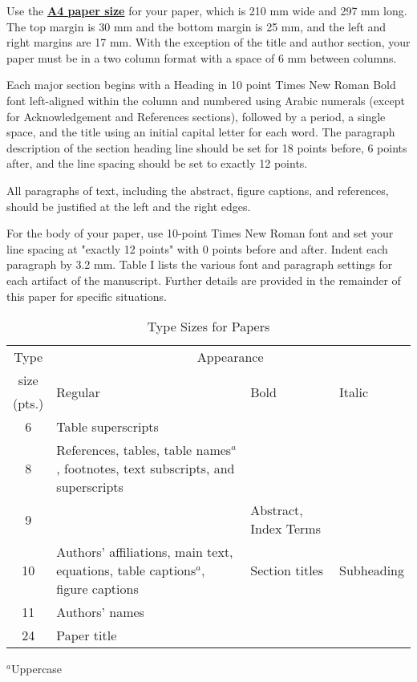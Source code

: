 \documentclass[conference,a4paper]{isap2025}
\begin{document}
Use the \underline{\bf A4 paper size} for your paper, which is 210 mm wide and 297 mm long. The top margin is 30 mm and the bottom margin is 25 mm, and the left and right margins are 17 mm. With the exception of the title and author section, your paper must be in a two column format with a space of 6 mm between columns. 

Each major section begins with a Heading in 10 point Times New Roman Bold font left-aligned within the column and numbered using Arabic numerals (except for Acknowledgement and References sections), followed by a period, a single space, and the title using an initial capital letter for each word. The paragraph description of the section heading line should be set for 18 points before, 6 points after, and the line spacing should be set to exactly 12 points.

All paragraphs of text, including the abstract, figure captions, and references, should be justified at the left and the right edges.

For the body of your paper, use 10-point Times New Roman font and set your line spacing at "exactly 12 points" with 0 points before and after. Indent each paragraph by 3.2 mm. Table I lists the various font and paragraph settings for each artifact of the manuscript. Further details are provided in the remainder of this paper for specific situations.

\begin{table}[htb]
\caption{Type Sizes for Papers}
\begin{center}
\begin{tabular}{|c|p{30mm}|p{15mm}|p{15mm}|}
\hline
Type & \multicolumn{3}{|c|}{Appearance} 
\\
\cline{2-4} 
size & \multirow{2}{*}{Regular} & \multirow{2}{*}{Bold} & \multirow{2}{*}{Italic}
\\[-0.5mm]
(pts.) & & & 
\\
\hline
6 & Table superscripts & & 
\\
\hline
8 & References, tables, table names$^a$, footnotes, text subscripts, and superscripts & & 
\\ 
\hline
9 & & Abstract, Index Terms	& 
\\ 
\hline
10 & Authors' affiliations, main text, equations, table captions$^a$, figure captions & Section titles & Subheading
\\
\hline
11 & Authors' names	& & 
\\
\hline
24 & Paper title & &	
\\
\hline
\end{tabular}
\end{center}
\hspace*{15mm}
$^a$Uppercase		
\label{tab1}
\end{table}
\end{document}
